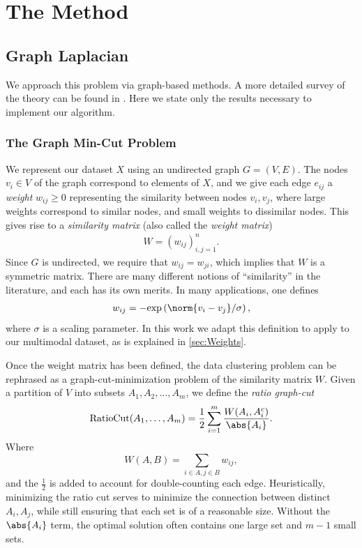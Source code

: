 \documentclass{article}
\begin{document}
\section{The Method}
\label{sec:method}

\subsection{Graph Laplacian} \label{sec:GraphLaplacian} We approach this problem
via graph-based methods. A more detailed survey of the theory can be found in
\cite{vonLuxburg07}. Here we state only the results necessary to implement our
algorithm.

\subsubsection{The Graph Min-Cut Problem} \label{sec:GraphMinCut} We represent
our dataset $X$ using an undirected graph $G = (V,E)$. The nodes $v_i\in V$ of
the graph correspond to elements of $X$, and we give each edge $e_{ij}$ a
\emph{weight} $w_{ij}\geq 0$ representing the similarity between nodes
$v_i, v_j$, where large weights correspond to similar nodes, and small weights
to dissimilar nodes. This gives rise to a \emph{similarity matrix} (also called
the \emph{weight matrix})
\begin{align}W = \left(w_{ij}\right)_{i,j=1}^n.\end{align} Since $G$ is undirected, we require that
$w_{ij} = w_{ji}$, which implies that $W$ is a symmetric matrix. There are many
different notions of ``similarity'' in the literature, and each has its own
merits. In many applications, one defines
\begin{align}w_{ij} = -\text{exp}\left(\norm{v_i -v_j} / \sigma \right),\end{align} where $\sigma$
is a scaling parameter. In this work we adapt this definition to apply to our
multimodal dataset, as is explained in \ref{sec:Weights}.

Once the weight matrix has been defined, the data clustering problem can be
rephrased as a graph-cut-minimization problem of the similarity matrix
$W$. Given a partition of $V$ into subsets $A_1,A_2,\ldots,A_m$, we define the
\emph{ratio graph-cut}
\begin{align}
  \text{RatioCut}(A_1,\ldots,A_m) = \frac{1}{2}\sum_{i=1}^m
  \frac{W(A_i,A_i^c)}{\abs{A_i}}.
\end{align}
Where
\[W(A,B) = \sum_{i\in A, j\in B}w_{ij},\] and the $\frac{1}{2}$ is added to
account for double-counting each edge.  Heuristically, minimizing the ratio cut
serves to minimize the connection between distinct $A_i, A_j$, while still
ensuring that each set is of a reasonable size. Without the $\abs{A_i}$ term,
the optimal solution often contains one large set and $m-1$ small sets.
\end{document}

